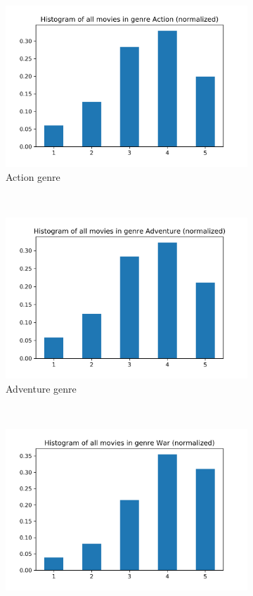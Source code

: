 \documentclass{article}
\begin{document}
\begin{figure}[H]
	\centering
	\begin{subfigure}[t]{0.3\textwidth}
		\centering
		\includegraphics[width=\textwidth]{Fig4-4-1}
		\caption{Action genre}
	\end{subfigure}%
	~ 
	\begin{subfigure}[t]{0.3\textwidth}
		\centering
		\includegraphics[width=\textwidth]{Fig4-4-2}
		\caption{Adventure genre}
	\end{subfigure}
	~
	\begin{subfigure}[t]{0.3\textwidth}
		\centering
		\includegraphics[width=\textwidth]{Fig4-4-3}

\end{subfigure}
\end{figure}
\end{document}
